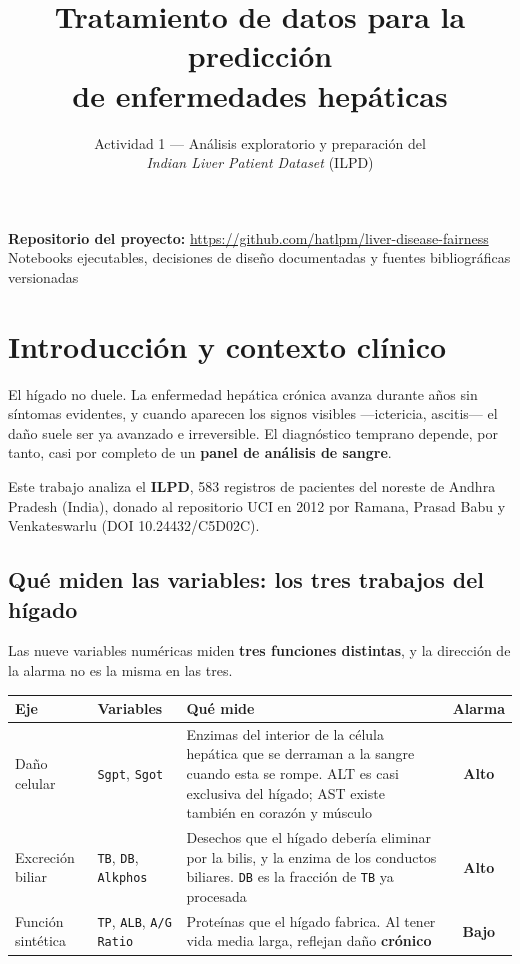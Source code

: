 \documentclass[10pt,a4paper]{article}
\title{\vspace{-1.6cm}\textbf{Tratamiento de datos para la predicción\\de enfermedades hepáticas}}
\author{Actividad 1 --- Análisis exploratorio y preparación del \\
\textit{Indian Liver Patient Dataset} (ILPD)}
\date{}
\begin{document}
\maketitle
\vspace{-1.1cm}
\begin{center}
\small
\textbf{Repositorio del proyecto:} \url{https://github.com/hatlpm/liver-disease-fairness}\\[0.15em]
\footnotesize Notebooks ejecutables, decisiones de diseño documentadas y fuentes bibliográficas versionadas
\end{center}
\vspace{-0.5cm}

\section{Introducción y contexto clínico}

El hígado no duele. La enfermedad hepática crónica avanza durante años sin síntomas evidentes, y cuando aparecen los signos visibles ---ictericia, ascitis--- el daño suele ser ya avanzado e irreversible. El diagnóstico temprano depende, por tanto, casi por completo de un \textbf{panel de análisis de sangre}.

Este trabajo analiza el \textbf{ILPD}, 583 registros de pacientes del noreste de Andhra Pradesh (India), donado al repositorio UCI en 2012 por Ramana, Prasad Babu y Venkateswarlu (DOI 10.24432/C5D02C).

\subsection{Qué miden las variables: los tres trabajos del hígado}

Las nueve variables numéricas miden \textbf{tres funciones distintas}, y la dirección de la alarma no es la misma en las tres.

\begin{table}[H]
\footnotesize
\begin{tabularx}{\textwidth}{@{}l l X c@{}}
\toprule
\textbf{Eje} & \textbf{Variables} & \textbf{Qué mide} & \textbf{Alarma} \\
\midrule
Daño celular & \texttt{Sgpt}, \texttt{Sgot} & Enzimas del interior de la célula hepática que se derraman a la sangre cuando esta se rompe. ALT es casi exclusiva del hígado; AST existe también en corazón y músculo & \textbf{Alto} \\
Excreción biliar & \texttt{TB}, \texttt{DB}, \texttt{Alkphos} & Desechos que el hígado debería eliminar por la bilis, y la enzima de los conductos biliares. \texttt{DB} es la fracción de \texttt{TB} ya procesada & \textbf{Alto} \\
Función sintética & \texttt{TP}, \texttt{ALB}, \texttt{A/G Ratio} & Proteínas que el hígado fabrica. Al tener vida media larga, reflejan daño \textbf{crónico} & \textbf{Bajo} \\
\bottomrule
\end{tabularx}
\end{table}
\end{document}
